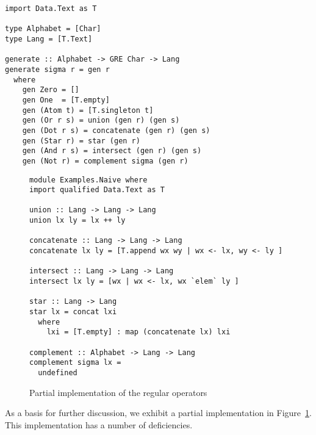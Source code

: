 \begin{lstlisting}
import Data.Text as T

type Alphabet = [Char]
type Lang = [T.Text]

generate :: Alphabet -> GRE Char -> Lang
generate sigma r = gen r
  where
    gen Zero = []
    gen One  = [T.empty]
    gen (Atom t) = [T.singleton t]
    gen (Or r s) = union (gen r) (gen s)
    gen (Dot r s) = concatenate (gen r) (gen s)
    gen (Star r) = star (gen r)
    gen (And r s) = intersect (gen r) (gen s)
    gen (Not r) = complement sigma (gen r)
\end{lstlisting}
\begin{figure}[tp]
\begin{lstlisting}
module Examples.Naive where
import qualified Data.Text as T

union :: Lang -> Lang -> Lang
union lx ly = lx ++ ly

concatenate :: Lang -> Lang -> Lang
concatenate lx ly = [T.append wx wy | wx <- lx, wy <- ly ]

intersect :: Lang -> Lang -> Lang
intersect lx ly = [wx | wx <- lx, wx `elem` ly ]

star :: Lang -> Lang
star lx = concat lxi
  where
    lxi = [T.empty] : map (concatenate lx) lxi

complement :: Alphabet -> Lang -> Lang
complement sigma lx =
  undefined
\end{lstlisting}
  \caption{Partial implementation of the regular operators}
  \label{fig:regular-operators-0}
\end{figure}
As a basis for further discussion, we exhibit a partial 
implementation in Figure~\ref{fig:regular-operators-0}.
This implementation has a number of deficiencies.
